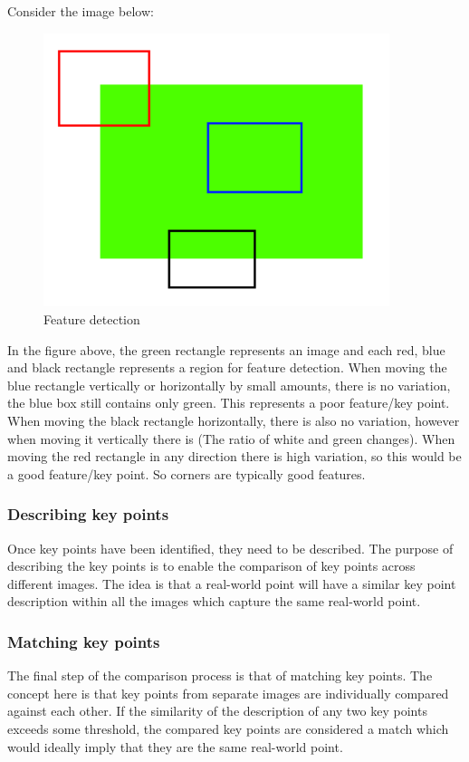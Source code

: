 \documentclass[11pt,a4paper]{report}
\begin{document}
				Consider the image below:
				
				\begin{figure}[H]
					\centering
					\includegraphics[width=0.9\textwidth]{feature_detection}
					\caption{Feature detection}
				\end{figure}
				
				In the figure above, the green rectangle represents an image and each red, blue and black rectangle represents a region for feature detection. When moving the blue rectangle vertically or horizontally by small amounts, there is no variation, the blue box still contains only green. This represents a poor feature/key point. 
				When moving the black rectangle horizontally, there is also no variation, however when moving it vertically there is (The ratio of white and green changes). When moving the red rectangle in any direction there is high variation, so this would be a good feature/key point. So corners are typically good features.
				
			\subsubsection{Describing key points}
				Once key points have been identified, they need to be described. The purpose of describing the key points is to enable the comparison of key points across different images. The idea is that a real-world point will have a similar key point description within all the images which capture the same real-world point.
				
			\subsubsection{Matching key points}
				The final step of the comparison process is that of matching key points. The concept here is that key points from separate images are individually compared against each other. If the similarity of the description of any two key points exceeds some threshold, the compared key points are considered a match which would ideally imply that they are the same real-world point.
		
\end{document}
